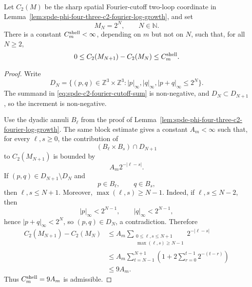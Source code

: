 \begin{proposition}
\label{prop:spde-phi-four-three-c2-dyadic-shell-bound}
Let \(C_2(M)\) be the sharp spatial Fourier-cutoff two-loop coordinate in
Lemma~\ref{lem:spde-phi-four-three-c2-fourier-log-growth}, and set
\[
  M_N=2^N,\qquad N\in\mathbb N .
\]
There is a constant \(C_m^{\rm shell}<\infty\), depending on \(m\) but not
on \(N\), such that, for all \(N\geq2\),
\[
  0\leq C_2(M_{N+1})-C_2(M_N)\leq C_m^{\rm shell}.
\]
\end{proposition}

\begin{proof}
Write
\[
  D_N=\{(p,q)\in\mathbb Z^3\times\mathbb Z^3:
       |p|_\infty,|q|_\infty,|p+q|_\infty\leq2^N\}.
\]
The summand in \eqref{eq:spde-c2-fourier-cutoff-sum} is non-negative, and
\(D_N\subset D_{N+1}\), so the increment is non-negative.

Use the dyadic annuli \(B_\ell\) from the proof of
Lemma~\ref{lem:spde-phi-four-three-c2-fourier-log-growth}.  The same
block estimate gives a constant \(A_m<\infty\) such that, for every
\(\ell,s\geq0\), the contribution of
\[
  (B_\ell\times B_s)\cap D_{N+1}
\]
to \(C_2(M_{N+1})\) is bounded by
\[
  A_m2^{-|\ell-s|}.
\]
If \((p,q)\in D_{N+1}\setminus D_N\) and
\[
  p\in B_\ell,\qquad q\in B_s,
\]
then \(\ell,s\leq N+1\).  Moreover, \(\max(\ell,s)\geq N-1\).  Indeed, if
\(\ell,s\leq N-2\), then
\[
  |p|_\infty<2^{N-1},\qquad |q|_\infty<2^{N-1},
\]
hence \(|p+q|_\infty<2^N\), so \((p,q)\in D_N\), a contradiction.
Therefore
\[
\begin{aligned}
  C_2(M_{N+1})-C_2(M_N)
  &\leq
  A_m
  \sum_{\substack{0\leq\ell,s\leq N+1\\
                  \max(\ell,s)\geq N-1}}
  2^{-|\ell-s|}                                      \\
  &\leq
  A_m\sum_{t=N-1}^{N+1}
  \left(1+2\sum_{r=0}^{t-1}2^{-(t-r)}\right)          \\
  &\leq
  9A_m .
\end{aligned}
\]
Thus \(C_m^{\rm shell}=9A_m\) is admissible.
\end{proof}

